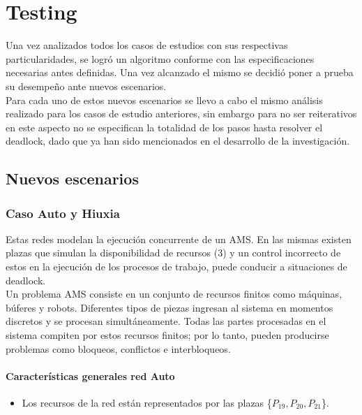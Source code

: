 \chapter{Testing} %
Una vez analizados todos los casos de estudios con sus respectivas particularidades, se logró un algoritmo conforme con las especificaciones necesarias antes definidas. Una vez alcanzado el mismo se decidió poner a prueba su desempeño ante nuevos escenarios.\\
Para cada uno de estos nuevos escenarios se llevo a cabo el mismo análisis realizado para los casos de estudio anteriores, sin embargo para no ser reiterativos en este aspecto no se especifican la totalidad de los pasos hasta resolver el deadlock, dado que ya han sido mencionados en el desarrollo de la investigación.

\section{Nuevos escenarios}


\subsection{Caso Auto y Hiuxia}
Estas redes modelan la ejecución concurrente de un AMS.
En las mismas existen plazas que simulan la disponibilidad de recursos (3) y un control incorrecto de estos en la ejecución de los procesos de trabajo, puede conducir a situaciones de deadlock.\\
Un problema AMS consiste en un conjunto de recursos finitos como máquinas, búferes y robots. Diferentes tipos de piezas ingresan al sistema en momentos discretos y se procesan simultáneamente. Todas las partes procesadas en el sistema compiten por estos recursos finitos; por lo tanto, pueden producirse problemas como bloqueos, conflictos e interbloqueos. 

\subsubsection{Características generales red Auto}
\begin{itemize}
    \item Los recursos de la red están representados por las plazas \{$P_{19},P_{20},P_{21}$\}.
\end{itemize}


